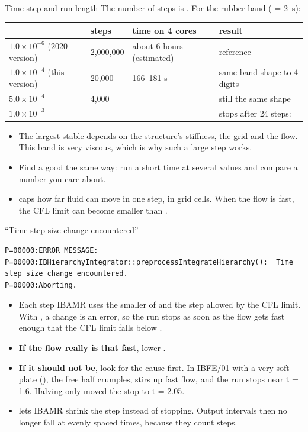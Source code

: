 \documentclass[aspectratio=169,11pt]{beamer}
\begin{document}
\begin{frame}{Time step and run length}
The number of steps is . For the rubber band ( = 2~s):
\vspace{2mm}

\small
\begin{tabular}{@{}L{0.24\textwidth}L{0.12\textwidth}L{0.22\textwidth}L{0.33\textwidth}@{}}
\toprule
{} & steps & time on 4 cores & result \\
\midrule
$1.0\times10^{-6}$ (2020 version) & 2{,}000{,}000 & about 6 hours (estimated) & reference \\
$1.0\times10^{-4}$ (this version) & 20{,}000 & 166--181 s & same band shape to 4 digits \\
$5.0\times10^{-4}$ & 4{,}000 & & still the same shape \\
$1.0\times10^{-3}$ & & & stops after 24 steps:  \\
\bottomrule
\end{tabular}
\vspace{3mm}
\begin{itemize}\small
  \item The largest stable  depends on the structure's stiffness, the grid and the flow. This band is very viscous, which is why such a large step works.
  \item Find a good  the same way: run a short time at several values and compare a number you care about.
  \item {} caps how far fluid can move in one step, in grid cells. When the flow is fast, the CFL limit can become smaller than .
\end{itemize}
\end{frame}

\begin{frame}[fragile]{``Time step size change encountered''}
\begin{lstlisting}
P=00000:ERROR MESSAGE:
P=00000:IBHierarchyIntegrator::preprocessIntegrateHierarchy():  Time step size change encountered.
P=00000:Aborting.
\end{lstlisting}
\begin{itemize}\small
  \item Each step IBAMR uses the smaller of  and the step allowed by the CFL limit. With , a change is an error, so the run stops as soon as the flow gets fast enough that the CFL limit falls below .
  \item \textbf{If the flow really is that fast}, lower .
  \item \textbf{If it should not be}, look for the cause first. In IBFE/01 with a very soft plate (), the free half crumples, stirs up fast flow, and the run stops near t = 1.6. Halving  only moved the stop to t = 2.05.
  \item {} lets IBAMR shrink the step instead of stopping. Output intervals then no longer fall at evenly spaced times, because they count steps.
\end{itemize}
\end{frame}
\end{document}
